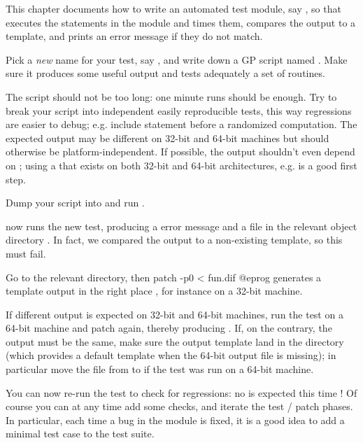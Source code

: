 This chapter documents how to write an automated test module, say ,
so that  executes the statements in the  module
and times them, compares the output to a template, and prints an error
message if they do not match.

\item Pick a \emph{new} name for your test, say , and write down a
GP script named . Make sure it produces some useful output and tests
adequately a set of routines.

\item The script should not be too long: one minute runs should be enough.
Try to break your script into independent easily reproducible tests, this way
regressions are easier to debug; e.g. include  statement before
a randomized computation. The expected output may be different on 32-bit and
64-bit machines but should otherwise be platform-independent. If possible, the
output shouldn't even depend on ; using a 
that exists on both 32-bit and 64-bit architectures, e.g.  is a
good first step.

\item Dump your script into  and run .

\item {} now runs the new test, producing a \kbd{[BUG]} error
message and a  file in the relevant object directory .
In fact, we compared the output to a non-existing template, so this must fail.

\item Go to the relevant  directory, then
\bprog
  patch -p0 < fun.dif
@eprog\noindent
generates a template output in the right place , for
instance on a 32-bit machine.

\item If different output is expected on 32-bit and 64-bit machines, run the
test on a 64-bit machine and patch again, thereby
producing . If, on the contrary, the output must be the
same, make sure the output template land in the  directory
(which provides a default template when the 64-bit output file is missing);
in particular move the file from  to 
if the test was run on a 64-bit machine.

\item You can now re-run the test to check for regressions: no \kbd{[BUG]}
is expected this time ! Of course you can at any time add some checks, and
iterate the test / patch phases. In particular, each time a bug in the
 module is fixed, it is a good idea to add a minimal test case to
the test suite.

